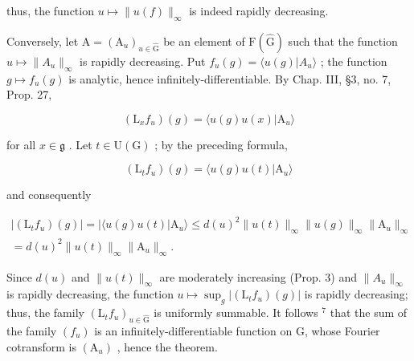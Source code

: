 thus, the function \(u \mapsto \|u(f)\|_{\infty}\) is indeed rapidly decreasing.

Conversely, let \(\mathrm{A} = (\mathrm{A}_{u})_{u \in \hat{\mathrm{G}}}\) be an element of \(\mathrm{F}(\hat{\mathrm{G}})\) such that the function \(u \mapsto \|A_{u}\|_{\infty}\) is rapidly decreasing. Put \(f_{u}(g) = \langle u(g)|A_{u} \rangle\) ; the function \(g \mapsto f_{u}(g)\) is analytic, hence infinitely-differentiable. By Chap. III, §3, no. 7, Prop. 27,

\[
(\mathrm{L} _ {x} f _ {u}) (g) = \langle u (g) u (x) | \mathrm{A} _ {u} \rangle
\]

for all \(x \in \mathfrak{g}\) . Let \(t \in \mathrm{U}(\mathrm{G})\) ; by the preceding formula,

\[
(\mathrm{L} _ {t} f _ {u}) (g) = \langle u (g) u (t) | \mathrm{A} _ {u} \rangle
\]

and consequently

\[
\begin{array}{r} | (\mathrm{L} _ {t} f _ {u}) (g) | = | \langle u (g) u (t) | \mathrm{A} _ {u} \rangle \leq d (u) ^ {2} \| u (t) \| _ {\infty} \| u (g) \| _ {\infty} \| \mathrm{A} _ {u} \| _ {\infty} \\ = d (u) ^ {2} \| u (t) \| _ {\infty} \| \mathrm{A} _ {u} \| _ {\infty}. \end{array}
\]

Since \(d(u)\) and \(\|u(t)\|_{\infty}\) are moderately increasing (Prop. 3) and \(\|A_{u}\|_{\infty}\) is rapidly decreasing, the function \(u \mapsto \sup_{g} |(\mathrm{L}_{t}f_{u})(g)|\) is rapidly decreasing; thus, the family \((\mathrm{L}_{t}f_{u})_{u \in \hat{\mathrm{G}}}\) is uniformly summable. It follows \(^{7}\) that the sum of the family \((f_{u})\) is an infinitely-differentiable function on G, whose Fourier cotransform is \((\mathrm{A}_{u})\) , hence the theorem.

